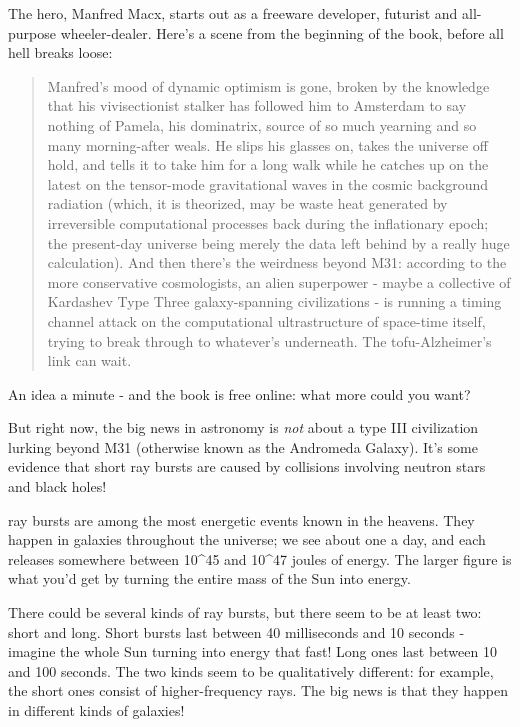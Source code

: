 The hero, Manfred Macx, starts out as a freeware developer, futurist 
and all-purpose wheeler-dealer.  Here's a scene from the beginning
of the book, before all hell breaks loose:

\begin{quote}
     Manfred's mood of dynamic optimism is gone, broken by the 
     knowledge that his vivisectionist stalker has followed him 
     to Amsterdam  to say nothing of Pamela, his dominatrix, 
     source of so much yearning and so many morning-after weals. 
     He slips his glasses on, takes the universe off hold, and 
     tells it to take him for a long walk while he catches up on 
     the latest on the tensor-mode gravitational waves in the 
     cosmic background radiation (which, it is theorized, may be 
     waste heat generated by irreversible computational processes 
     back during the inflationary epoch; the present-day universe 
     being merely the data left behind by a really huge calculation). 
     And then there's the weirdness beyond M31: according to the 
     more conservative cosmologists, an alien superpower - maybe 
     a collective of Kardashev Type Three galaxy-spanning 
     civilizations - is running a timing channel attack on the 
     computational ultrastructure of space-time itself, trying to 
     break through to whatever's underneath.  The tofu-Alzheimer's 
     link can wait.
\end{quote}
    

An idea a minute - and the book is free online: what more could you 
want?  

But right now, the big news in astronomy is \emph{not} about a type III 
civilization lurking beyond M31 (otherwise known as the Andromeda
Galaxy).  It's some evidence that short \gamma  ray bursts are caused 
by collisions involving neutron stars and black holes!

\Gamma  ray bursts are among the most energetic events known in the
heavens.   They happen in galaxies throughout the universe; we see 
about one a day, and each releases somewhere between 10^{45} and 
10^{47} joules of energy.  The larger figure is what you'd get by 
turning the entire mass of the Sun into energy.  

There could be several kinds of \gamma  ray bursts, but there seem to
be at least two: short and long.   Short bursts last between 
40 milliseconds and 10 seconds - imagine the whole Sun turning into 
energy that fast!  Long ones last between 10 and 100 seconds.  The
two kinds seem to be qualitatively different: for example, the short 
ones consist of higher-frequency \gamma  rays.  The big news is that 
they happen in different kinds of galaxies!

